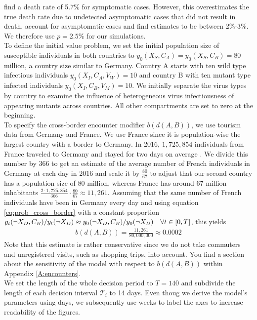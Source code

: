 \cite{Baud.2020} find a death rate of 5.7\% for symptomatic cases. However, this overestimates the true death rate due to undetected asymptomatic cases that did not result in death. \cite{Wu.2020} account for asymptomatic cases and find estimates to be between 2\%-3\%. We therefore use $p=2.5\%$ for our simulations.\\

To define the initial value problem, we set the initial population size of susceptible individuals in both countries to $y_0(X_S, C_A) = y_0(X_S, C_B) = 80$ million, a country size similar to Germany. Country A starts with ten wild type infectious individuals $y_0(X_I, C_A, V_W) = 10$ and country B with ten mutant type infected individuals $y_0(X_I, C_B, V_M) = 10$. We initially separate the virus types by country to examine the influence of heterogeneous virus infectiousness of appearing mutants across countries. All other compartments are set to zero at the beginning. \\

To specify the cross-border encounter modifier $b(d(A,B))$, we use tourism data from Germany and France. We use France since it is population-wise the largest country with a border to Germany. In 2016, $1,725,854$ individuals from France traveled to Germany and stayed for two days on average \citep{SBA.2017}. We divide this number by 366 to get an estimate of the average number of French individuals in Germany at each day in 2016 and scale it by $\frac{80}{67}$ to adjust that our second country has a population size of 80 million, whereas France has around 67 million inhabitants $\frac{2 \cdot 1,725,854}{366} \cdot \frac{80}{67
} \approx 11,261$. Assuming that the same number of French individuals have been in Germany every day and using equation \eqref{eq:prob_cross_border} with a constant proportion $y_t(\neg X_D, C_B) / y_t(\neg X_D) \approx y_0(\neg X_D, C_B) / y_0(\neg X_D) \quad \forall t \in [0,T]$, this yields 
\begin{align*}
b(d(A, B)) = \frac{11,261}{80,000,000} \approx 0.0002
\end{align*}
Note that this estimate is rather conservative since we do not take commuters and unregistered visits, such as shopping trips, into account. You find a section about the sensitivity of the model with respect to $b(d(A, B))$ within Appendix \ref{A:encounters}. \\

We set the length of the whole decision period to $T=140$ and subdivide the length of each decision interval $\mathcal{T}_i$ to 14 days. Even thoug we derive the model's parameters using days, we subsequently use weeks to label the axes to increase readability of the figures.

